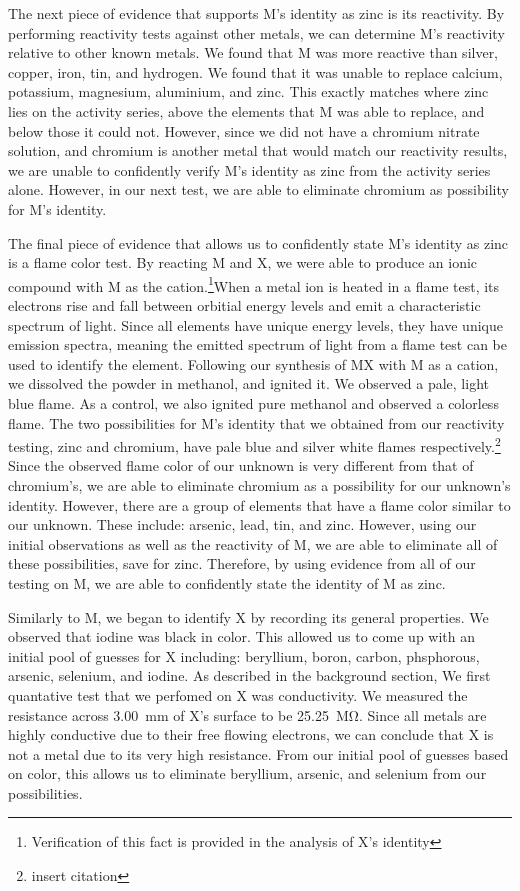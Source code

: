 \documentclass[titlepage]{article}
\begin{document}
The next piece of evidence that supports M's identity as zinc is its reactivity. By performing reactivity tests against other metals, we can determine M's reactivity relative to other known metals. We found that M was more reactive than silver, copper, iron, tin, and hydrogen. We found that it was unable to replace calcium, potassium, magnesium, aluminium, and zinc. This exactly matches where zinc lies on the activity series, above the elements that M was able to replace, and below those it could not. However, since we did not have a chromium nitrate solution, and chromium is another metal that would match our reactivity results, we are unable to confidently verify M's identity as zinc from the activity series alone. However, in our next test, we are able to eliminate chromium as possibility for M's identity.

The final piece of evidence that allows us to confidently state M's identity as zinc is a flame color test. By reacting M and X, we were able to produce an ionic compound with M as the cation.\footnote{Verification of this fact is provided in the analysis of X's identity}When a metal ion is heated in a flame test, its electrons rise and fall between orbitial energy levels and emit a characteristic spectrum of light. Since all elements have unique energy levels, they have unique emission spectra, meaning the emitted spectrum of light from a flame test can be used to identify the element. Following our synthesis of MX with M as a cation, we dissolved the powder in methanol, and ignited it. We observed a pale, light blue flame. As a control, we also ignited pure methanol and observed a colorless flame. The two possibilities for M's identity that we obtained from our reactivity testing, zinc and chromium, have pale blue and silver white flames respectively.\footnote{insert citation} Since the observed flame color of our unknown is very different from that of chromium's, we are able to eliminate chromium as a possibility for our unknown's identity. However, there are a group of elements that have a flame color similar to our unknown. These include: arsenic, lead, tin, and zinc. However, using our initial observations as well as the reactivity of M, we are able to eliminate all of these possibilities, save for zinc. Therefore, by using evidence from all of our testing on M, we are able to confidently state the identity of M as zinc.

\bigskip
Similarly to M, we began to identify X by recording its general properties. We observed that iodine was black in color. This allowed us to come up with an initial pool of guesses for X including: beryllium, boron, carbon, phsphorous, arsenic, selenium, and iodine. As described in the background section, We first quantative test that we perfomed on X was conductivity. We measured the resistance across \qty{3.00}{\mm} of X's surface to be \qty{25.25}{\mega\ohm}. Since all metals are highly conductive due to their free flowing electrons, we can conclude that X is not a metal due to its very high resistance. From our initial pool of guesses based on color, this allows us to eliminate beryllium, arsenic, and selenium from our possibilities. 
\end{document}
